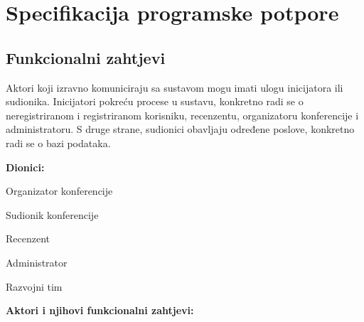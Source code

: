 \chapter{Specifikacija programske potpore}
		
		\section{Funkcionalni zahtjevi}
	
	Aktori koji izravno komuniciraju sa sustavom mogu imati ulogu inicijatora ili sudionika.
	Inicijatori pokreću procese u sustavu, konkretno radi se o neregistriranom i registriranom korisniku, recenzentu, organizatoru konferencije i administratoru. S druge strane, sudionici obavljaju određene poslove, konkretno radi se o bazi podataka.
	\newline
	
	
	
	
	\noindent \textbf{Dionici:}
	
	\begin{packed_enum}
		
		\item Organizator konferencije
		\item Sudionik konferencije
		\item Recenzent
		\item Administrator
		\item Razvojni tim
		
	\end{packed_enum}
	
	\noindent \textbf{Aktori i njihovi funkcionalni zahtjevi:}
	
